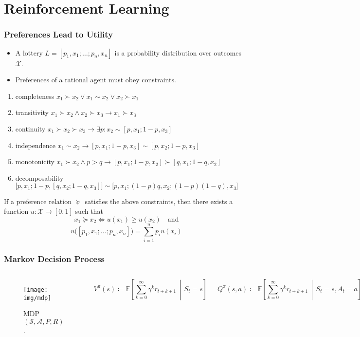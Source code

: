 \documentclass[UTF8,11pt,colorlinks,compress,openany]{beamer}%
\begin{document}
\section{Reinforcement Learning}

\begin{frame}\frametitle{Preferences Lead to Utility}
\setlength\abovedisplayskip{0pt}
\setlength\belowdisplayskip{0pt}\vspace*{-2pt}
\begin{itemize}
	\item A lottery $L=[p_1,x_1;\dots;p_n,x_n]$ is a probability distribution over outcomes $\mathcal{X}$.
	\item Preferences of a rational agent must obey constraints.
\end{itemize}
\begin{enumerate}
	\item completeness $x_1\succ x_2\vee x_1\sim x_2\vee x_2\succ x_1$
	\item transitivity $x_1\succ x_2\wedge x_2\succ x_3\to x_1\succ x_3$
	\item continuity $x_1\succ x_2\succ x_3\to\exists p: x_2\sim[p,x_1;1-p,x_3]$
	\item independence $x_1\sim x_2\to[p,x_1;1-p,x_3]\sim[p,x_2;1-p,x_3]$
	\item monotonicity $x_1\succ x_2\wedge p>q\to[p,x_1;1-p,x_2]\succ[q,x_1;1-q,x_2]$
	\item decomposability $\big[p,x_1;1-p,[q,x_2;1-q,x_3]\big]\sim\big[p,x_1;(1-p)q,x_2;(1-p)(1-q),x_3\big]$
\end{enumerate}\vspace*{-2pt}
\begin{theorem}
If a preference relation $\succeq$ satisfies the above constraints, then there exists a function $u:\mathcal{X}\to[0,1]$ such that
\[x_1\succeq x_2\iff u(x_1)\geq u(x_2)\quad\mbox{and}\]
\[u\big([p_1,x_1;\dots;p_n,x_n]\big)=\sum\limits_{i=1}^n p_i u(x_i)\]
\end{theorem}
\end{frame}

\begin{frame}\frametitle{Markov Decision Process}
\begin{columns}
	\begin{figure}
	\texttt{[image: img/mdp]}\caption{MDP $(\mathcal{S},\mathcal{A},P, R)$.}
	\end{figure}
	\begin{definition}
		\[V^\pi(s)\coloneqq \mathbb{E}\left[\sum\limits_{k=0}^\infty\gamma^k r_{t+k+1}\,\middle|\, S_t=s\right]\]
	\end{definition}
	\begin{definition}
		\[Q^\pi(s,a)\coloneqq \mathbb{E}\left[\sum\limits_{k=0}^\infty\gamma^k r_{t+k+1}\,\middle|\, S_t=s,A_t=a\right]\]
	\end{definition}
\end{columns}
\end{frame}
\end{document}

